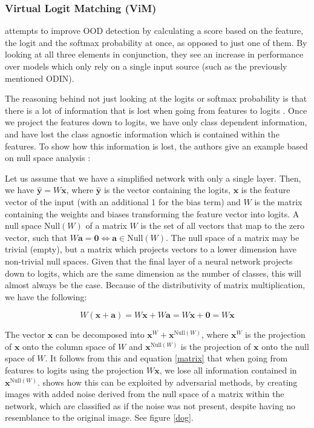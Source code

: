 \documentclass[UKenglish]{uiomasterthesis} %
\theoremstyle{definition}
\begin{document}
\subsubsection{Virtual Logit Matching (ViM)}

\cite{vim} attempts to improve OOD detection by calculating a score based on the feature, the logit and the softmax probability at once, as opposed to just one of them. By looking at all three elements in conjunction, they see an increase in performance over models which only rely on a single input source (such as the previously mentioned ODIN).

The reasoning behind not just looking at the logits or softmax probability is that there is a lot of information that is lost when going from features to logits \cite{vim}. Once we project the features down to logits, we have only class dependent information, and have lost the class agnostic information which is contained within the features. To show how this information is lost, the authors give an example based on null space analysis \cite{nusa}:

Let us assume that we have a simplified network with only a single layer. Then, we have $\hat{\bm{y}} = W \bm{x}$, where $\hat{\bm{y}}$ is the vector containing the logits, $\bm{x}$ is the feature vector of the input (with an additional 1 for the bias term) and $W$ is the matrix containing the weights and biases transforming the feature vector into logits. A null space $\text{Null}(W)$ of a matrix $W$ is the set of all vectors that map to the zero vector, such that $W \bm{a} = \bm{0} \iff \bm{a} \in \text{Null}(W)$. The null space of a matrix may be trivial (empty), but a matrix which projects vectors to a lower dimension have non-trivial null spaces. Given that the final layer of a neural network projects down to logits, which are the same dimension as the number of classes, this will almost always be the case. Because of the distributivity of matrix multiplication, we have the following:

\begin{equation}
W (\bm{x} + \bm{a}) = W \bm{x} + W \bm{a} = W \bm{x} + \bm{0} = W \bm{x}
\label{matrix}
\end{equation}

The vector $\bm{x}$ can be decomposed into $\bm{x}^W + \bm{x}^{\text{Null}(W)}$, where $\bm{x}^W$ is the projection of $\bm{x}$ onto the column space of $W$ and $\bm{x}^{\text{Null}(W)}$ is the projection of $\bm{x}$ onto the null space of $W$. It follows from this and equation \ref{matrix} that when going from features to logits using the projection $W \bm{x}$, we lose all information contained in $\bm{x}^{\text{Null}(W)}$. \cite{nusa} shows how this can be exploited by adversarial methods, by creating images with added noise derived from the null space of a matrix within the network, which are classified as if the noise was not present, despite having no resemblance to the original image. See figure \ref{dog}.
\end{document}
